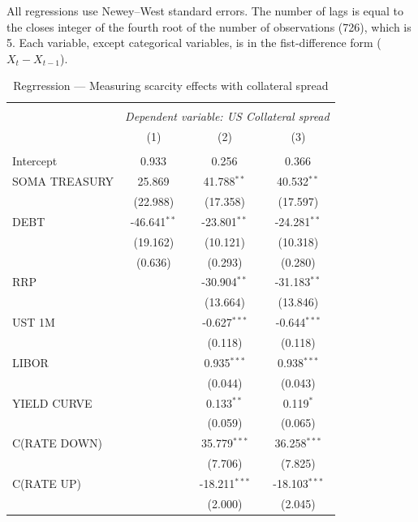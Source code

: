 \documentclass[11pt,a4paper,english,oneside]{article}
\begin{document}



All regressions use Newey–West standard errors. The number of lags is equal to the closes integer of the fourth root of the number of observations (726), which is 5. Each variable, except categorical variables, is in the fist-difference form ($X_t-X_{t-1}$).

\begin{table}[!htbp] \centering
\caption{Regrression --- Measuring scarcity effects with collateral spread}
\begin{tabular}{@{\extracolsep{5pt}}lccc}
\\[-1.8ex]\hline
\hline \\[-1.8ex]
& \multicolumn{3}{c}{\textit{Dependent variable: US Collateral spread}} \
\cr \cline{3-4}
\\[-1.8ex] & (1) & (2) & (3) \\
\hline \\[-1.8ex]
 Intercept & 0.933$^{}$ & 0.256$^{}$ & 0.366$^{}$ \\
 SOMA TREASURY & 25.869$^{}$ & 41.788$^{**}$ & 40.532$^{**}$ \\
  & (22.988) & (17.358) & (17.597) \\
 DEBT & -46.641$^{**}$ & -23.801$^{**}$ & -24.281$^{**}$ \\
  & (19.162) & (10.121) & (10.318) \\
  & (0.636) & (0.293) & (0.280) \\
 RRP & & -30.904$^{**}$ & -31.183$^{**}$ \\
  & & (13.664) & (13.846) \\
 UST 1M & & -0.627$^{***}$ & -0.644$^{***}$ \\
  & & (0.118) & (0.118) \\
 LIBOR & & 0.935$^{***}$ & 0.938$^{***}$ \\
  & & (0.044) & (0.043) \\
 YIELD CURVE & & 0.133$^{**}$ & 0.119$^{*}$ \\
  & & (0.059) & (0.065) \\
 C(RATE DOWN) & & 35.779$^{***}$ & 36.258$^{***}$ \\
  & & (7.706) & (7.825) \\
 C(RATE UP) & & -18.211$^{***}$ & -18.103$^{***}$ \\
  & & (2.000) & (2.045) \\

\end{tabular}
\end{table}
\end{document}

